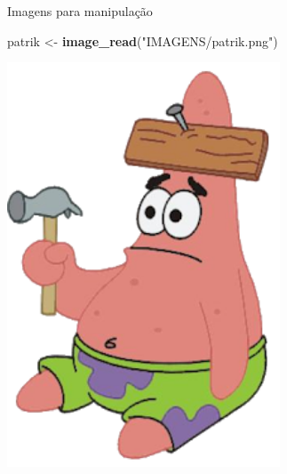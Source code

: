 \documentclass[
  ignorenonframetext,
]{beamer}
\newenvironment{Shaded}{\begin{snugshade}}{\end{snugshade}}
\newcommand{\KeywordTok}[1]{\textcolor[rgb]{0.13,0.29,0.53}{\textbf{#1}}}
\newcommand{\NormalTok}[1]{#1}
\newcommand{\StringTok}[1]{\textcolor[rgb]{0.31,0.60,0.02}{#1}}
\begin{document}
\begin{frame}[fragile]{Imagens para manipulação}
\protect\hypertarget{imagens-para-manipulauxe7uxe3o}{}

\small

\begin{Shaded}
\begin{Highlighting}[]
\NormalTok{patrik <-}\StringTok{ }\KeywordTok{image_read}\NormalTok{(}\StringTok{"IMAGENS/patrik.png"}\NormalTok{)}
\end{Highlighting}
\end{Shaded}

\includegraphics[width=3.2in]{IMAGENS/patrik}

\begin{center}
\tiny{}
\end{center}

\end{frame}
\end{document}
